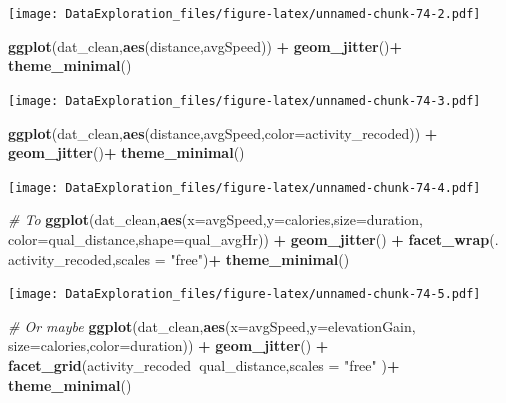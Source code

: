 \documentclass[
]{book}
\newenvironment{Shaded}{\begin{snugshade}}{\end{snugshade}}
\newcommand{\CommentTok}[1]{\textcolor[rgb]{0.56,0.35,0.01}{\textit{#1}}}
\newcommand{\DataTypeTok}[1]{\textcolor[rgb]{0.13,0.29,0.53}{#1}}
\newcommand{\KeywordTok}[1]{\textcolor[rgb]{0.13,0.29,0.53}{\textbf{#1}}}
\newcommand{\NormalTok}[1]{#1}
\newcommand{\OperatorTok}[1]{\textcolor[rgb]{0.81,0.36,0.00}{\textbf{#1}}}
\newcommand{\StringTok}[1]{\textcolor[rgb]{0.31,0.60,0.02}{#1}}
\begin{document}
\texttt{[image: DataExploration\_files/figure-latex/unnamed-chunk-74-2.pdf]}

\begin{Shaded}
\begin{Highlighting}[]
\KeywordTok{ggplot}\NormalTok{(dat_clean,}\KeywordTok{aes}\NormalTok{(distance,avgSpeed)) }\OperatorTok{+}\StringTok{ }\KeywordTok{geom_jitter}\NormalTok{()}\OperatorTok{+}
\StringTok{  }\KeywordTok{theme_minimal}\NormalTok{()}
\end{Highlighting}
\end{Shaded}

\texttt{[image: DataExploration\_files/figure-latex/unnamed-chunk-74-3.pdf]}

\begin{Shaded}
\begin{Highlighting}[]
\KeywordTok{ggplot}\NormalTok{(dat_clean,}\KeywordTok{aes}\NormalTok{(distance,avgSpeed,}\DataTypeTok{color=}\NormalTok{activity_recoded))  }\OperatorTok{+}\StringTok{ }
\StringTok{  }\KeywordTok{geom_jitter}\NormalTok{()}\OperatorTok{+}
\StringTok{  }\KeywordTok{theme_minimal}\NormalTok{()}
\end{Highlighting}
\end{Shaded}

\texttt{[image: DataExploration\_files/figure-latex/unnamed-chunk-74-4.pdf]}

\begin{Shaded}
\begin{Highlighting}[]
\CommentTok{# To }
\KeywordTok{ggplot}\NormalTok{(dat_clean,}\KeywordTok{aes}\NormalTok{(}\DataTypeTok{x=}\NormalTok{avgSpeed,}\DataTypeTok{y=}\NormalTok{calories,}\DataTypeTok{size=}\NormalTok{duration,}
                     \DataTypeTok{color=}\NormalTok{qual_distance,}\DataTypeTok{shape=}\NormalTok{qual_avgHr)) }\OperatorTok{+}\StringTok{ }
\StringTok{  }\KeywordTok{geom_jitter}\NormalTok{() }\OperatorTok{+}\StringTok{ }
\StringTok{  }\KeywordTok{facet_wrap}\NormalTok{(.}\OperatorTok{~}\StringTok{ }\NormalTok{activity_recoded,}\DataTypeTok{scales =} \StringTok{"free"}\NormalTok{)}\OperatorTok{+}
\StringTok{  }\KeywordTok{theme_minimal}\NormalTok{()}
\end{Highlighting}
\end{Shaded}

\texttt{[image: DataExploration\_files/figure-latex/unnamed-chunk-74-5.pdf]}

\begin{Shaded}
\begin{Highlighting}[]
\CommentTok{# Or maybe}
\KeywordTok{ggplot}\NormalTok{(dat_clean,}\KeywordTok{aes}\NormalTok{(}\DataTypeTok{x=}\NormalTok{avgSpeed,}\DataTypeTok{y=}\NormalTok{elevationGain,}
                     \DataTypeTok{size=}\NormalTok{calories,}\DataTypeTok{color=}\NormalTok{duration)) }\OperatorTok{+}\StringTok{ }
\StringTok{  }\KeywordTok{geom_jitter}\NormalTok{() }\OperatorTok{+}\StringTok{ }
\StringTok{  }\KeywordTok{facet_grid}\NormalTok{(activity_recoded}\OperatorTok{~}\NormalTok{qual_distance,}\DataTypeTok{scales =} \StringTok{"free"}\NormalTok{ )}\OperatorTok{+}
\StringTok{  }\KeywordTok{theme_minimal}\NormalTok{()}
\end{Highlighting}
\end{Shaded}
\end{document}
